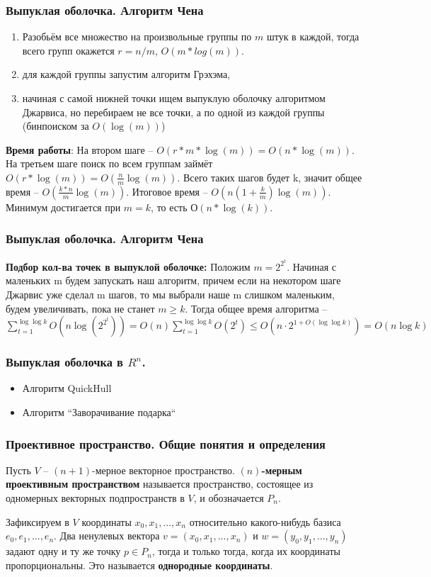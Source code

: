 \documentclass[notheorems,aspectratio=169]{beamer}
\begin{document}
\begin{frame}\frametitle{Выпуклая оболочка. Алгоритм Чена}
	\begin{enumerate}
		\item Разобьём все множество на произвольные группы по $m$ штук в каждой, 
		тогда всего групп окажется $r = n / m$, $O\left(m * log(m)\right)$.
		\item для каждой группы запустим алгоритм Грэхэма, 
		\item начиная с самой нижней точки ищем выпуклую оболочку алгоритмом Джарвиса, но перебираем не все точки, а по одной из каждой группы (бинпоиском за  $O\left(\log(m)\right)$)
	\end{enumerate}
	\textbf{Время работы}: На втором шаге -- $O\left(r*m*\log(m)\right) = O\left(n*\log(m)\right)$. 
	На третьем шаге поиск по всем группам займёт $O\left(r*\log(m)\right)=O\left(\frac{n}{m}\log(m)\right)$. 
	Всего таких шагов будет k, значит общее время -- $O\left(\frac{k*n}{m}\log(m)\right)$. 
	Итоговое время -- $O\left(n\left(1+\frac{k}{m}\right)\log(m)\right)$. Минимум достигается при $m=k$, то есть $О\left(n*\log(k)\right)$.
\end{frame}

\begin{frame}\frametitle{Выпуклая оболочка. Алгоритм Чена}
	\textbf{Подбор кол-ва точек в выпуклой оболочке:} Положим $m = 2^{2^t}$. Начиная с маленьких m будем запускать наш алгоритм, причем если на некотором шаге Джарвис уже сделал m шагов, то мы выбрали наше m слишком маленьким, будем увеличивать, пока не станет $m \geq k$. Тогда общее время алгоритма -- 
	$ \sum_{t=1}^{\log\log k} O\left(n \log(2^{2^t})\right) = O(n) \sum_{t=1}^{\log\log k} O(2^t) \leq O\left(n \cdot 2^{1+O(\log\log k)}\right) = O(n \log k)$
\end{frame}

\begin{frame}\frametitle{Выпуклая оболочка в $R^n$.}
	\begin{itemize}
		\item Алгоритм QuickHull
		\item Алгоритм ``Заворачивание подарка``
	\end{itemize}
\end{frame}

\begin{frame}\frametitle{Проективное пространство. Общие понятия и определения}
	Пусть $V$ -- $(n+1)$-мерное векторное пространство.
	\textbf{$(n)$-мерным проективным пространством} называется пространство, состоящее из одномерных векторных подпространств в $V$, и обозначается $P_n$. 
	
	Зафиксируем в $V$ координаты $x_0, x_1,..., x_n$
	относительно какого-нибудь базиса $e_0, e_1,..., e_n$. Два ненулевых вектора
	$v = (x_0, x_1,..., x_n)$ и $w = (y_0, y_1,..., y_n)$
	задают одну и ту же точку $p \in P_n$, тогда и только тогда, когда их координаты пропорциональны. Это называется \textbf{однородные координаты}.
\end{frame}
\end{document}
